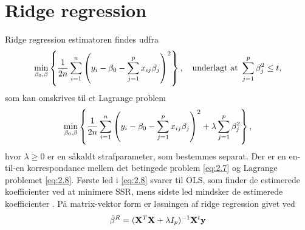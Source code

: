 \section{Ridge regression}
Ridge regression estimatoren findes udfra
\begin{align}
\min_{\beta_0, \beta} \cbr{\frac{1}{2n} \sum_{i=1}^n \del{y_i - \beta_0 - \sum_{j=1}^p x_{ij} \beta_j}^2}, \quad \text{underlagt at } \sum_{j=1}^p \beta_j^2 \leq t, \label{eq:2.7}
\end{align}
som kan omskrives til et Lagrange problem
\begin{align}
\min_{\beta_0, \beta} \cbr{\frac{1}{2n} \sum_{i=1}^n \del{y_i - \beta_0 - \sum_{j=1}^p x_{ij} \beta_j}^2 + \lambda \sum_{j=1}^p \beta_j^2},
\end{align} \label{eq:2.8}
hvor $\lambda \geq 0$ er en såkaldt strafparameter, som bestemmes separat.
Der er en en-til-en korrespondance mellem det betingede problem \eqref{eq:2.7} og Lagrange problemet \eqref{eq:2.8}.
Første led i \eqref{eq:2.8} svarer til OLS, som finder de estimerede koefficienter ved at minimere SSR, mens sidste led mindsker de estimerede koefficienter .
På matrix-vektor form er løsningen af ridge regression givet ved
\begin{align*}
\hat{\beta}^R = (\mathbf{X}^T \mathbf{X} + \lambda I_p)^{-1} \mathbf{X}^t \mathbf{y}
\end{align*} 